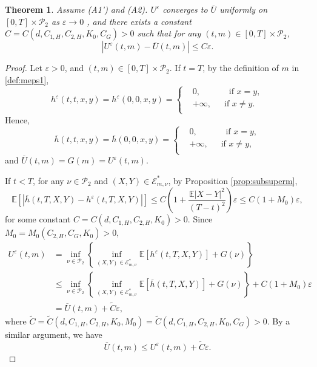 \documentclass[reqno,11pt]{amsart}
\newtheorem{theorem}{Theorem}[section]
\numberwithin{equation}{section}
\newcommand{\e}{\varepsilon}
\newcommand{\ep}{\varepsilon}
\renewcommand{\bar}{\overline}
\begin{document}
\begin{theorem}\label{thm: unif conv}
    Assume {\rm (A1')} and {\rm (A2)}. $U^\ep$ converges to $\bar{U}$ uniformly on $[0, T] \times \mathcal{P}_2$ as $\ep \to 0$ , and there exists a constant $C=C\left(d, C_{1, H}, C_{2,H},K_0, C_G\right)>0$ such that for any $(t, m)\in [0,T] \times \mathcal{P}_2$,
    \[
    \left|U^\ep\left(t,m\right)-\bar{U}\left(t, m\right)\right|\leq C \ep.
    \]
\end{theorem}
\begin{proof}
Let $\ep>0$, and $(t, m)\in [0,T] \times \mathcal{P}_2$. If $t=T$, by the definition of $m$ in \eqref{def:meps1},
\[
   h^\e \left(t,t,x,y\right)=h^\e\left(0,0,x,y\right)=\left\{\begin{aligned}
    &0, \qquad \quad \text{ if } x=y,\\
    &+\infty, \quad \, \text{ if } x \neq y.\\
    \end{aligned}\right.
\]
Hence,
\[
    \bar{h}\left(t,t,x,y\right)=\bar{h}\left(0,0,x,y\right)=\left\{\begin{aligned}
    &0, \qquad \quad \text{ if } x=y,\\
    &+\infty, \quad \, \text{ if } x \neq y,\\
    \end{aligned}\right.
\]
and
$\bar{U}(t, m)=G(m)=U^\ep(t, m)$.


If $t<T$, for any $\nu \in \mathcal{P}_2$ and $(X,Y) \in \mathcal{E}^\ast_{m, \nu}$, by Proposition \ref{prop:subsuperm},
    \[
\mathbb{E} \left[\left|\bar{h}\left(t, T,X,Y\right)- h^\e \left(t,T,X,Y\right)\right|\right] \leq C \left(1+ \frac{\mathbb{E}|X-Y|^2}{(T-t)^2}\right)\e \leq C\left(1+M_0\right)\ep,
    \]
for some constant \(C=C(d, C_{1, H}, C_{2, H}, K_0)>0\). Since $M_0=M_0\left(C_{2,H},C_G, K_0\right)>0$,
\[
\begin{aligned}
U^\ep(t, m)&=\inf_{\nu \in \mathcal{P}_2} \left\{
\inf_{(X, Y) \in \mathcal{E}^\ast_{m,\nu}}
\mathbb{E}[h^\e(t,T,X,Y)]+ G(\nu)\right\}\\
&\leq \inf_{\nu\in\mathcal{P}_2}\left\{\inf_{(X, Y) \in \mathcal{E}^\ast_{m,\nu}}
\mathbb{E}[\bar{h}(t,T,X,Y)]+G(\nu)\right\} +C(1+M_0)\ep\\
&=\bar{U}(t,m)+\tilde{C}\ep,
\end{aligned}
\]
where $\tilde{C}=\tilde{C}(d,C_{1, H}, C_{2,H}, K_0, M_0)=\tilde{C}(d,C_{1, H}, C_{2,H}, K_0, C_G)>0$.
By a similar argument, we have
\[
\bar{U}\left(t, m\right)\leq U^\ep\left(t, m\right)+\tilde{C}\ep.
\]
\end{proof}
\end{document}
